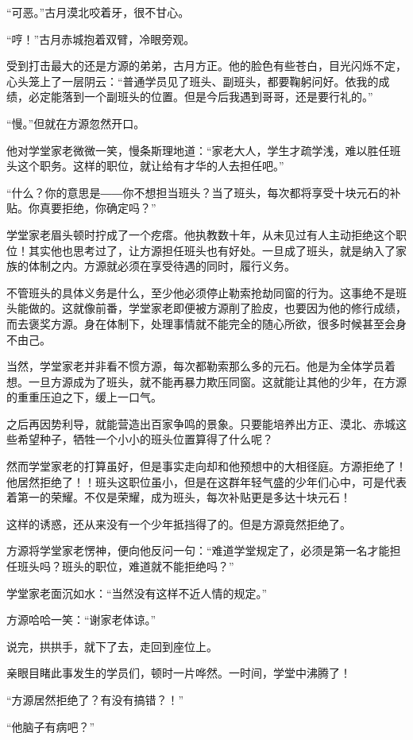 \begin{this_body}
“可恶。”古月漠北咬着牙，很不甘心。

“哼！”古月赤城抱着双臂，冷眼旁观。

受到打击最大的还是方源的弟弟，古月方正。他的脸色有些苍白，目光闪烁不定，心头笼上了一层阴云：“普通学员见了班头、副班头，都要鞠躬问好。依我的成绩，必定能落到一个副班头的位置。但是今后我遇到哥哥，还是要行礼的。”

“慢。”但就在方源忽然开口。

他对学堂家老微微一笑，慢条斯理地道：“家老大人，学生才疏学浅，难以胜任班头这个职务。这样的职位，就让给有才华的人去担任吧。”

“什么？你的意思是――你不想担当班头？当了班头，每次都将享受十块元石的补贴。你真要拒绝，你确定吗？”

学堂家老眉头顿时拧成了一个疙瘩。他执教数十年，从未见过有人主动拒绝这个职位！其实他也思考过了，让方源担任班头也有好处。一旦成了班头，就是纳入了家族的体制之内。方源就必须在享受待遇的同时，履行义务。

不管班头的具体义务是什么，至少他必须停止勒索抢劫同窗的行为。这事绝不是班头能做的。这就像前番，学堂家老即便被方源削了脸皮，也要因为他的修行成绩，而去褒奖方源。身在体制下，处理事情就不能完全的随心所欲，很多时候甚至会身不由己。

当然，学堂家老并非看不惯方源，每次都勒索那么多的元石。他是为全体学员着想。一旦方源成为了班头，就不能再暴力欺压同窗。这就能让其他的少年，在方源的重重压迫之下，缓上一口气。

之后再因势利导，就能营造出百家争鸣的景象。只要能培养出方正、漠北、赤城这些希望种子，牺牲一个小小的班头位置算得了什么呢？

然而学堂家老的打算虽好，但是事实走向却和他预想中的大相径庭。方源拒绝了！他居然拒绝了！！班头这职位虽小，但是在这群年轻气盛的少年们心中，可是代表着第一的荣耀。不仅是荣耀，成为班头，每次补贴更是多达十块元石！

这样的诱惑，还从来没有一个少年抵挡得了的。但是方源竟然拒绝了。

方源将学堂家老愣神，便向他反问一句：“难道学堂规定了，必须是第一名才能担任班头吗？班头的职位，难道就不能拒绝吗？”

学堂家老面沉如水：“当然没有这样不近人情的规定。”

方源哈哈一笑：“谢家老体谅。”

说完，拱拱手，就下了去，走回到座位上。

亲眼目睹此事发生的学员们，顿时一片哗然。一时间，学堂中沸腾了！

“方源居然拒绝了？有没有搞错？！”

“他脑子有病吧？”


\end{this_body}
